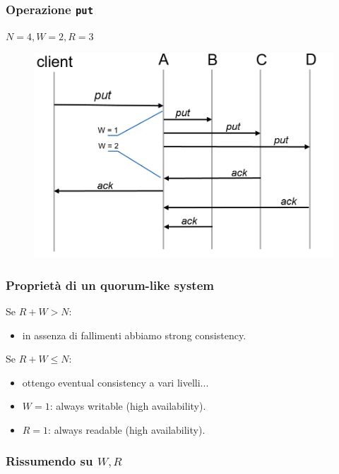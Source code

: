 \begin{frame}
  \frametitle{Operazione \texttt{put}}
  $N = 4, W = 2, R = 3$
  \begin{figure}
  \centering
  \includegraphics[scale=0.38]{dynamo/put.png}
  \end{figure}
\end{frame}


\begin{frame}
  \frametitle{Proprietà di un quorum-like system}
  \begin{block}{Se $R + W > N:$}
    \begin{itemize}
      \item in assenza di fallimenti abbiamo \alert{strong consistency}.
    \end{itemize}
  \end{block}
  \begin{block}{Se $R + W \leq N:$}
    \begin{itemize}
    \item ottengo \alert{eventual consistency} a vari livelli...
    \item $W = 1$: always writable (high availability).
    \item $R = 1$: always readable (high availability).
    \end{itemize}
  \end{block}
\end{frame}


\begin{frame}
  \frametitle{Rissumendo su $W, R$}
\end{frame}



